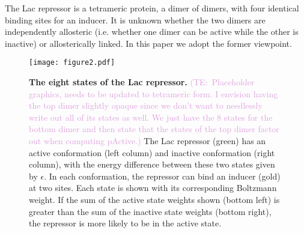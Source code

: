 \documentclass[10pt,letterpaper]{article}
\newcommand\globalScalePlots{1}
\newcommand{\talComment}[1]{\textcolor{Plum}{(TE:~#1)}}
\begin{document}
The Lac repressor is a tetrameric protein, a dimer of dimers, with four
identical binding sites for an inducer. It is unknown whether the two dimers are independently allosteric (i.e. whether one dimer can be active while the other is inactive) or allosterically linked. In this paper we adopt the former viewpoint.

\begin{figure}[h]
	\centering \texttt{[image: figure2.pdf]} \caption{{\bf
			The eight states of the Lac repressor.} \talComment{Placeholder graphics, needs
			to be updated to tetrameric form. I envision having the top dimer slightly
			opaque since we don't want to needlessly write out all of its states as well.
			We just have the 8 states for the bottom dimer and then state that the states
			of the top dimer factor out when computing pActive.} The Lac repressor (green)
		has an active conformation (left column) and inactive conformation (right
		column), with the energy difference between these two states given by
		$\epsilon$. In each conformation, the repressor can bind an inducer (gold) at
		two sites. Each state is shown with its corresponding Boltzmann weight. If the
		sum of the active state weights shown (bottom left) is greater than the sum of
		the inactive state weights (bottom right), the repressor is more likely to be
		in the active state.} \label{figrepressorInducerStates}
\end{figure}
\end{document}
